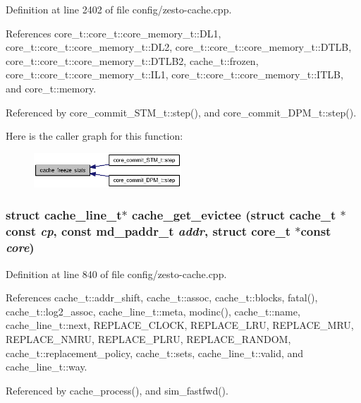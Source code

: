 Definition at line 2402 of file config/zesto-cache.cpp.

References core\_\-t::core\_\-t::core\_\-memory\_\-t::DL1, core\_\-t::core\_\-t::core\_\-memory\_\-t::DL2, core\_\-t::core\_\-t::core\_\-memory\_\-t::DTLB, core\_\-t::core\_\-t::core\_\-memory\_\-t::DTLB2, cache\_\-t::frozen, core\_\-t::core\_\-t::core\_\-memory\_\-t::IL1, core\_\-t::core\_\-t::core\_\-memory\_\-t::ITLB, and core\_\-t::memory.

Referenced by core\_\-commit\_\-STM\_\-t::step(), and core\_\-commit\_\-DPM\_\-t::step().

Here is the caller graph for this function:\nopagebreak
\begin{figure}[H]
\begin{center}
\leavevmode
\includegraphics[width=157pt]{zesto-cache_8h_bd1fe8334f2259dc773b85f98c7fbcfa_icgraph}
\end{center}
\end{figure}
\subsubsection[{cache\_\-get\_\-evictee}]{\setlength{\rightskip}{0pt plus 5cm}struct {\bf cache\_\-line\_\-t}$\ast$ cache\_\-get\_\-evictee (struct {\bf cache\_\-t} $\ast$const  {\em cp}, \/  const {\bf md\_\-paddr\_\-t} {\em addr}, \/  struct {\bf core\_\-t} $\ast$const  {\em core})\hspace{0.3cm}{\tt  [read]}}\label{zesto-cache_8h_ff8ad962ac5134671915f22e604a2f4e}




Definition at line 840 of file config/zesto-cache.cpp.

References cache\_\-t::addr\_\-shift, cache\_\-t::assoc, cache\_\-t::blocks, fatal(), cache\_\-t::log2\_\-assoc, cache\_\-line\_\-t::meta, modinc(), cache\_\-t::name, cache\_\-line\_\-t::next, REPLACE\_\-CLOCK, REPLACE\_\-LRU, REPLACE\_\-MRU, REPLACE\_\-NMRU, REPLACE\_\-PLRU, REPLACE\_\-RANDOM, cache\_\-t::replacement\_\-policy, cache\_\-t::sets, cache\_\-line\_\-t::valid, and cache\_\-line\_\-t::way.

Referenced by cache\_\-process(), and sim\_\-fastfwd().

